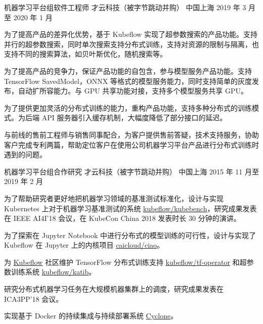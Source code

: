 \begin{cventries}
  \cventry
    {机器学习平台组软件工程师} %
    {才云科技（被字节跳动并购）} %
    {中国上海} %
    {2019 年 3 月至 2020 年 1 月} %
    {
      \begin{cvitems} %
        \item 为了提高产品的差异化优势，基于 Kubeflow 实现了超参数搜索的产品功能。支持并行的超参数搜索，同时单次搜索支持分布式训练，支持对资源的限制与隔离，也支持不同的搜索算法，如贝叶斯优化，随机搜索等。
        \item 为了提高产品的竞争力，保证产品功能的自包含，参与模型服务产品功能。支持 TensorFlow SavedModel，ONNX 等格式的模型服务能力，同时支持简单的灰度发布，自动扩所容能力。与 GPU 共享功能对接，支持多个模型服务共享 GPU。
        \item 为了提供更加灵活的分布式训练的能力，重构产品功能，支持多种分布式的训练模式。为后端 API 服务器引入缓存机制，大幅度降低了部分接口的延迟。
        \item 与前线的售前工程师与销售同事配合，为客户提供售前答疑，技术支持服务，协助客户完成专利两篇，帮助定位客户在使用公司机器学习平台产品进行分布式训练时遇到的问题。
      \end{cvitems}
    }

  \cventry
    {机器学习平台组合作研究} %
    {才云科技（被字节跳动并购）} %
    {中国上海} %
    {2015 年 11 月至 2019 年 2 月} %
    {
      \begin{cvitems} %
        \item 为了帮助研究者更好地把机器学习领域的基准测试标准化，设计与实现 Kubernetes 上对于机器学习基准测试的系统 \href{https://github.com/kubeflow/kubebench}{kubeflow/kubebench}，研究成果发表在 IEEE AI4I'18 会议，在 KubeCon China 2018 发表时长 30 分钟的演讲。
        \item 为了探索在 Jupyter Notebook 中进行分布式的模型训练的可行性，设计与实现了 Kubeflow 在 Jupyter 上的内核项目 \href{https://github.com/caicloud/ciao}{caicloud/ciao}。
        \item 为 \href{https://github.com/kubeflow/kubeflow}{Kubeflow} 社区维护 TensorFlow 分布式训练支持 \href{https://github.com/kubeflow/tf-operator}{kubeflow/tf-operator} 和超参数训练系统 \href{https://github.com/kubeflow/katib}{kubeflow/katib}。
        \item 研究分布式机器学习任务在大规模机器集群上的调度，研究成果发表在 ICA3PP'18 会议。
        \item 实现基于 Docker 的持续集成与持续部署系统 \href{https://github.com/caicloud/cyclone}{Cyclone}。
      \end{cvitems}
    }

\end{cventries}
